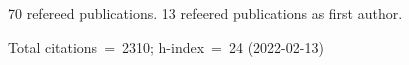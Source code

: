70 refereed publications. 13 refeered publications as first author.

Total citations~=~2310; h-index~=~24 (2022-02-13)